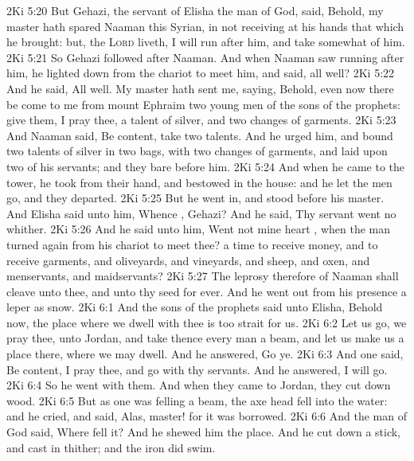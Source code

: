 \vs 2Ki 5:20 But Gehazi, the servant of Elisha the man of God, said, Behold, my master hath spared Naaman this Syrian, in not receiving at his hands that which he brought: but,  the \textsc{Lord} liveth, I will run after him, and take somewhat of him.
\vs 2Ki 5:21 So Gehazi followed after Naaman. And when Naaman saw  running after him, he lighted down from the chariot to meet him, and said,  all well?
\vs 2Ki 5:22 And he said, All  well. My master hath sent me, saying, Behold, even now there be come to me from mount Ephraim two young men of the sons of the prophets: give them, I pray thee, a talent of silver, and two changes of garments.
\vs 2Ki 5:23 And Naaman said, Be content, take two talents. And he urged him, and bound two talents of silver in two bags, with two changes of garments, and laid  upon two of his servants; and they bare  before him.
\vs 2Ki 5:24 And when he came to the tower, he took  from their hand, and bestowed  in the house: and he let the men go, and they departed.
\vs 2Ki 5:25 But he went in, and stood before his master. And Elisha said unto him, Whence , Gehazi? And he said, Thy servant went no whither.
\vs 2Ki 5:26 And he said unto him, Went not mine heart , when the man turned again from his chariot to meet thee?  a time to receive money, and to receive garments, and oliveyards, and vineyards, and sheep, and oxen, and menservants, and maidservants?
\vs 2Ki 5:27 The leprosy therefore of Naaman shall cleave unto thee, and unto thy seed for ever. And he went out from his presence a leper  as snow.
\vs 2Ki 6:1 And the sons of the prophets said unto Elisha, Behold now, the place where we dwell with thee is too strait for us.
\vs 2Ki 6:2 Let us go, we pray thee, unto Jordan, and take thence every man a beam, and let us make us a place there, where we may dwell. And he answered, Go ye.
\vs 2Ki 6:3 And one said, Be content, I pray thee, and go with thy servants. And he answered, I will go.
\vs 2Ki 6:4 So he went with them. And when they came to Jordan, they cut down wood.
\vs 2Ki 6:5 But as one was felling a beam, the axe head fell into the water: and he cried, and said, Alas, master! for it was borrowed.
\vs 2Ki 6:6 And the man of God said, Where fell it? And he shewed him the place. And he cut down a stick, and cast  in thither; and the iron did swim.
